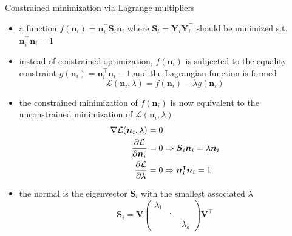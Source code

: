 \documentclass[xcolor=dvipsnames,10pt]{beamer}
\begin{document}
\begin{frame}{Constrained minimization via Lagrange multipliers}
    \begin{itemize}
        \item a function $f(\boldsymbol{n}_i) = \boldsymbol{n}_i^\intercal \boldsymbol{S}_i \boldsymbol{n}_i$ where $\boldsymbol{S}_i = \boldsymbol{Y}_i \boldsymbol{Y}_i^\intercal$ should be minimized s.t. $\boldsymbol{n}_i^\intercal \boldsymbol{n}_i = 1$
        \item instead of constrained optimization, $f(\boldsymbol{n}_i)$ is subjected to the equality constraint $g(\boldsymbol{n}_i) = \boldsymbol{n}_i^\intercal \boldsymbol{n}_i - 1$ and the Lagrangian function is formed
        \begin{equation*}
            \mathcal{L}(\boldsymbol{n}_i, \lambda) = f(\boldsymbol{n}_i) - \lambda g(\boldsymbol{n}_i)
        \end{equation*}
        \item the constrained minimization of $f(\boldsymbol{n}_i)$ is now equivalent to the unconstrained minimization of $\mathcal{L}(\boldsymbol{n}_i, \lambda)$
        \begin{align*}
            \centering
            \nabla \mathcal{L}(\boldsymbol{n}_i, \lambda) &= 0 \\
            \frac{\partial \mathcal{L}}{\partial \boldsymbol{n}_i} &= 0 \Rightarrow \boldsymbol{S}_i \boldsymbol{n}_i = \lambda \boldsymbol{n}_i \\
            \frac{\partial \mathcal{L}}{\partial \lambda} &= 0 \Rightarrow \boldsymbol{n}_i^\intercal \boldsymbol{n}_i = 1
        \end{align*}
        \item the normal is the eigenvector $\boldsymbol{S}_i$ with the smallest associated $\lambda$
        \begin{equation*}
            \boldsymbol{S}_i = \boldsymbol{V} \begin{pmatrix}
            \lambda_1 &  &  \\
            & \ddots & \\
            & & \lambda_d
            \end{pmatrix} \boldsymbol{V}^\intercal
        \end{equation*}
    \end{itemize}
\end{frame}
\end{document}
